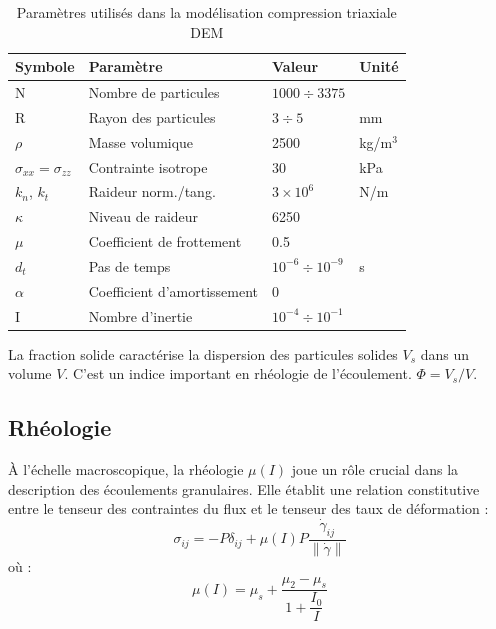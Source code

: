 \documentclass[5p,authoryear,square]{elsarticle}
\begin{document}
\begin{table}[htbp]
\centering
\footnotesize
\begin{tabular}{@{}llll@{}}
\toprule
\textbf{Symbole} & \textbf{Paramètre} & \textbf{Valeur} & \textbf{Unité} \\
\midrule
N & Nombre de particules & $1000 \div 3375$ &  \\
R & Rayon des particules & $3 \div 5 $& mm \\
$\rho$ & Masse volumique & 2500 & kg/m$^3$ \\
$\sigma_{xx} = \sigma_{zz}$ & Contrainte isotrope & 30 & kPa \\
$k_n$, $k_t$ & Raideur norm./tang. & $3 \times 10^6$ & N/m \\
$\kappa$ & Niveau de raideur & 6250 &  \\
$\mu$ & Coefficient de frottement & 0.5 &  \\
$d_t$ & Pas de temps & $10^{-6} \div 10^{-9}$ & s \\
$\alpha$ & Coefficient d'amortissement & 0 &  \\
I & Nombre d'inertie & $10^{-4} \div 10^{-1}$ &  \\
\bottomrule
\end{tabular}
\caption{Paramètres utilisés dans la modélisation compression triaxiale DEM}
\label{parametres_triaxiale}
\end{table}


La fraction solide caractérise la dispersion des particules solides $V_s$ dans un volume $V$.  
C'est un indice important en rhéologie de l'écoulement.  $\Phi = V_s/V$.


\subsection{Rhéologie}\label{rheologie}

À l'échelle macroscopique, la rhéologie $\mu(I)$ joue un rôle crucial dans la description des écoulements granulaires. Elle établit une relation constitutive entre le tenseur des contraintes du flux et le tenseur des taux de déformation  \cite{jop2006constitutive} :
\begin{equation}
\sigma_{ij} = -P \delta_{ij} + \mu(I) P \frac{\dot{\gamma}_{ij}}{\lVert \dot{\gamma} \rVert}
\label{flowTensor}
\end{equation}
où :
\begin{equation}
\mu(I) = \mu_s + \dfrac{\mu_2 - \mu_s}{1 + \dfrac{I_0}{I}}
\label{muI}
\end{equation}
\end{document}
